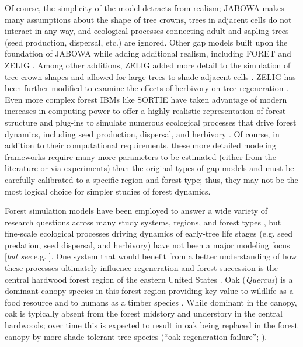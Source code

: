 \documentclass[
11pt, %
a4paper, %
oneside, %
headinclude,footinclude, %
]{scrartcl}
\begin{document}
Of course, the simplicity of the model detracts from realism; JABOWA makes many assumptions about the shape of tree crowns, trees in adjacent cells do not interact in any way, and ecological processes connecting adult and sapling trees (seed production, dispersal, etc.) are ignored. Other gap models built upon the foundation of JABOWA while adding additional realism, including FORET \citep{Shugart1977} and ZELIG \citep{Urban1990}. Among other additions, ZELIG added more detail to the simulation of tree crown shapes and allowed for large trees to shade adjacent cells \citep{Urban1992}. ZELIG has been further modified to examine the effects of herbivory on tree regeneration \citep{Seagle2001, Holm2013}. Even more complex forest IBMs like SORTIE have taken advantage of modern increases in computing power to offer a highly realistic representation of forest structure and plug-ins to simulate numerous ecological processes that drive forest dynamics, including seed production, dispersal, and herbivory \citep{Pacala1993}. Of course, in addition to their computational requirements, these more detailed modeling frameworks require many more parameters to be estimated (either from the literature or via experiments) than the original types of gap models and must be carefully calibrated to a specific region and forest type; thus, they may not be the most logical choice for simpler studies of forest dynamics.

Forest simulation models have been employed to answer a wide variety of research questions across many study systems, regions, and forest types \citep{Bugmann2001a, Bugmann2001a}, but fine-scale ecological processes driving dynamics of early-tree life stages (e.g. seed predation, seed dispersal, and herbivory) have not been a major modeling focus [\textit{but see} e.g. \citealp{Seagle2001, Holm2013}]. One system that would benefit from a better understanding of how these processes ultimately influence regeneration and forest succession is the central hardwood forest region of the eastern United States \citep{Fralish2003}. Oak (\textit{Quercus}) is a dominant canopy species in this forest region providing key value to wildlife as a food resource \citep{Mcshea2000, Mcshea1993} and to humans as a timber species \citep{Johnson2009}. While dominant in the canopy, oak is typically absent from the forest midstory and understory in the central hardwoods; over time this is expected to result in oak being  replaced in the forest canopy by more shade-tolerant tree species (“oak regeneration failure”; \citep{Aldrich2005, Nowacki2008}).
\end{document}
